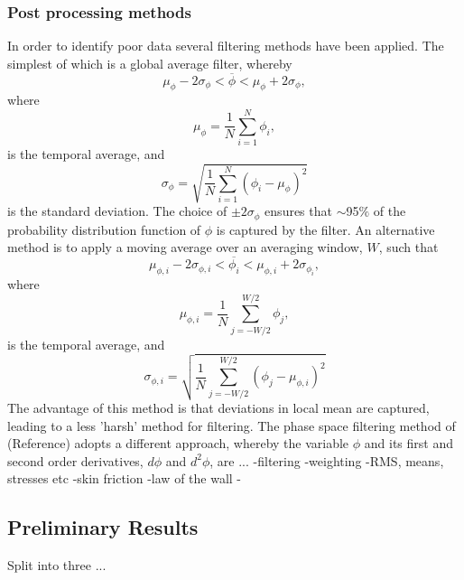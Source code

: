 \documentclass[12pt,oneside,a4paper]{article}
\begin{document}
\subsubsection{Post processing methods}
In order to identify poor data several filtering methods have been applied. The simplest of which is a global average filter, whereby 
\begin{equation}
\mu_\phi - 2 \sigma_\phi < \overline{\phi} < \mu_\phi + 2 \sigma_\phi,
\end{equation}
where 
\begin{equation}
\mu_\phi = \frac{1}{N} \sum^N_{i=1} \phi_i,
\end{equation}
is the temporal average, and
\begin{equation}
\sigma_\phi = \sqrt{\frac{1}{N} \sum^N_{i=1} (\phi_i - \mu_\phi)^2	} 
\end{equation}
is the standard deviation. The choice of $\pm 2 \sigma_\phi$ ensures that $\sim$95$\%$ of the probability distribution function of $\phi$ is captured by the filter. An alternative method is to apply a moving average over an averaging window, $W$, such that
\begin{equation}
\mu_{\phi,i} - 2 \sigma_{\phi,i} < \overline{\phi_i} < \mu_{\phi,i} + 2 \sigma_{\phi_i},
\end{equation}
where 
\begin{equation}
\mu_{\phi,i} = \frac{1}{N} \sum^{W/2}_{j=-W/2} \phi_j,
\end{equation}
is the temporal average, and
\begin{equation}
\sigma_{\phi,i} = \sqrt{\frac{1}{N} \sum^{W/2}_{j=-W/2} (\phi_j - \mu_{\phi,i})^2	} 
\end{equation}
\vspace{2cm}
The advantage of this method is that deviations in local mean are captured, leading to a less 'harsh' method for filtering. The phase space filtering method of (Reference) adopts a different approach, whereby the variable $\phi$ and its first and second order derivatives, $d \phi$ and $d^2 \phi$, are ...
-filtering
-weighting
-RMS, means, stresses etc
-skin friction
-law of the wall 
-
\subsection{Preliminary Results}
Split into three ...
\end{document}
